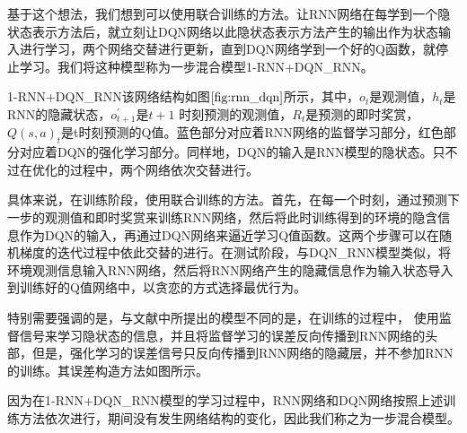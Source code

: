 基于这个想法，我们想到可以使用联合训练的方法。让RNN网络在每学到一个隐状态表示方法后，就立刻让DQN网络以此隐状态表示方法产生的输出作为状态输入进行学习，两个网络交替进行更新，直到DQN网络学到一个好的Q函数，就停止学习。我们将这种模型称为一步混合模型1-RNN+DQN\_RNN。



1-RNN+DQN_RNN该网络结构如图$\ref{fig:rnn_dqn}$所示，其中，$o_{t}$是观测值，$h_{t}$是RNN的隐藏状态，$o_{t+1}^{'}$是$t+1$ 时刻预测的观测值，$R_{t}$是预测的即时奖赏，$Q(s,a)_{t}$是t时刻预测的Q值。蓝色部分对应着RNN网络的监督学习部分，红色部分对应着DQN的强化学习部分。同样地，DQN的输入是RNN模型的隐状态。只不过在优化的过程中，两个网络依次交替进行。

具体来说，在训练阶段，使用联合训练的方法。首先，在每一个时刻，通过预测下一步的观测值和即时奖赏来训练RNN网络，然后将此时训练得到的环境的隐含信息作为DQN的输入，再通过DQN网络来逼近学习Q值函数。这两个步骤可以在随机梯度的迭代过程中依此交替的进行。在测试阶段，与DQN\_RNN模型类似，将环境观测信息输入RNN网络，然后将RNN网络产生的隐藏信息作为输入状态导入到训练好的Q值网络中，以贪恋的方式选择最优行为。

特别需要强调的是，与文献\citep{hausknecht2015deep,narasimhan2015language}中所提出的模型不同的是，在训练的过程中，
使用监督信号来学习隐状态的信息，并且将监督学习的误差反向传播到RNN网络的头部，但是，强化学习的误差信号只反向传播到RNN网络的隐藏层，并不参加RNN的训练。其误差构造方法如图所示。

因为在1-RNN+DQN\_RNN模型的学习过程中，RNN网络和DQN网络按照上述训练方法依次进行，期间没有发生网络结构的变化，因此我们称之为一步混合模型。


